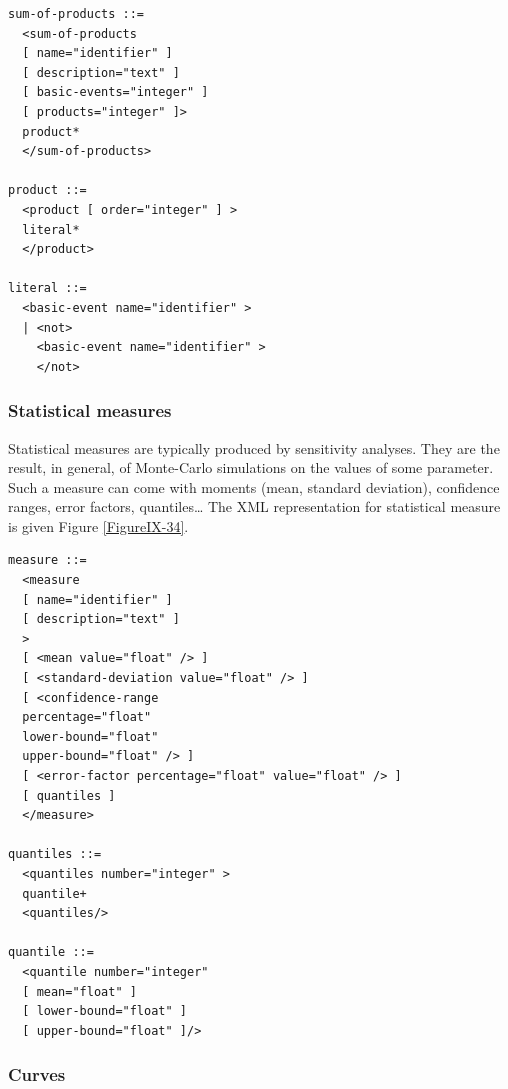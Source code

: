 \documentclass[11pt]{article}
\begin{document}
\begin{lstlisting}
sum-of-products ::=
  <sum-of-products
  [ name="identifier" ]
  [ description="text" ]
  [ basic-events="integer" ]
  [ products="integer" ]>
  product*
  </sum-of-products>

product ::=
  <product [ order="integer" ] >
  literal*
  </product>

literal ::=
  <basic-event name="identifier" >
  | <not> 
    <basic-event name="identifier" > 
    </not>
\end{lstlisting}

\subsubsection{Statistical measures}
\label{sec:org115eb34}

Statistical measures are typically produced by sensitivity analyses.
They are the result, in general, of Monte-Carlo simulations on the
values of some parameter. Such a measure can come with moments (mean,
standard deviation), confidence ranges, error factors, quantiles\ldots{} The
XML representation for statistical measure is given Figure \ref{FigureIX-34}.


\begin{lstlisting}
measure ::=
  <measure
  [ name="identifier" ]
  [ description="text" ]
  >
  [ <mean value="float" /> ]
  [ <standard-deviation value="float" /> ]
  [ <confidence-range
  percentage="float"
  lower-bound="float"
  upper-bound="float" /> ]
  [ <error-factor percentage="float" value="float" /> ]
  [ quantiles ]
  </measure>

quantiles ::=
  <quantiles number="integer" >
  quantile+
  <quantiles/>

quantile ::=
  <quantile number="integer"
  [ mean="float" ]
  [ lower-bound="float" ]
  [ upper-bound="float" ]/>
\end{lstlisting}



\subsubsection{Curves}
\label{sec:org23e80f9}
\end{document}
